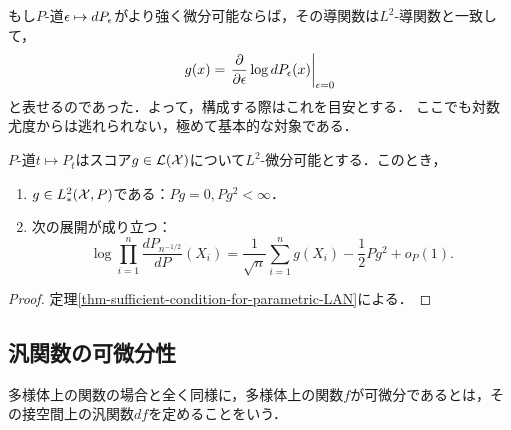 \documentclass[uplatex,dvipdfmx]{jsreport}
\begin{document}
\begin{example}[スコア関数の構成方法]
    もし$P$-道$\epsilon\mapsto dP_\epsilon$がより強く微分可能ならば，その導関数は$L^2$-導関数と一致して，
    \[g(x)=\left.\frac{\partial }{\partial \epsilon}\log dP_\epsilon(x)\right|_{\epsilon=0}\]
    と表せるのであった．よって，構成する際はこれを目安とする．
    ここでも対数尤度からは逃れられない，極めて基本的な対象である．
\end{example}

\begin{lemma}
    $P$-道$t\mapsto P_t$はスコア$g\in\mathcal{L}(\mathcal{X})$について$L^2$-微分可能とする．このとき，
    \begin{enumerate}
        \item $g\in L_*^2(\mathcal{X},P)$である：$Pg=0,Pg^2<\infty$．
        \item 次の展開が成り立つ：
        \[\log\prod^n_{i=1}\frac{dP_{n^{-1/2}}}{dP}(X_i)=\frac{1}{\sqrt{n}}\sum_{i=1}^ng(X_i)-\frac{1}{2}Pg^2+o_P(1).\]
    \end{enumerate}
\end{lemma}
\begin{proof}
    定理\ref{thm-sufficient-condition-for-parametric-LAN}による．
\end{proof}

\subsection{汎関数の可微分性}

\begin{tcolorbox}[colframe=ForestGreen, colback=ForestGreen!10!white,breakable,colbacktitle=ForestGreen!40!white,coltitle=black,fonttitle=\bfseries\sffamily,
title=]
    多様体上の関数の場合と全く同様に，多様体上の関数$f$が可微分であるとは，その接空間上の汎関数$df$を定めることをいう．
\end{tcolorbox}
\end{document}
